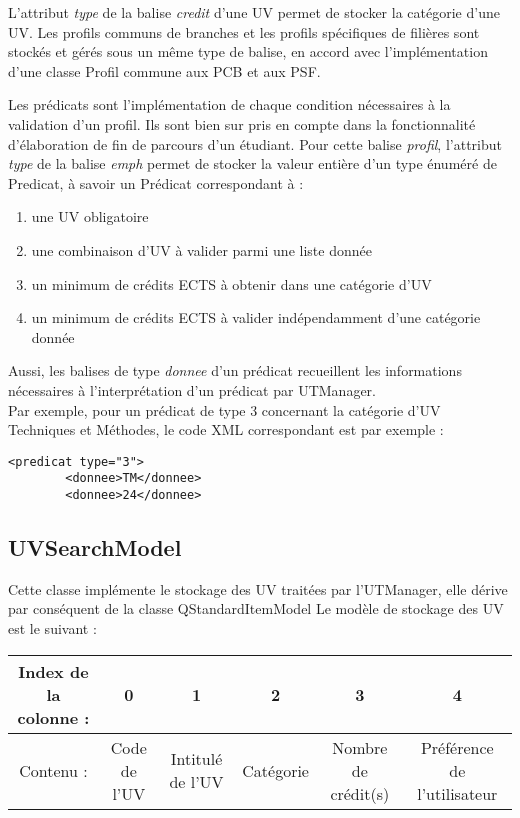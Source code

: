 \documentclass[a4paper,10pt,french]{report}
\begin{document}
	L'attribut \emph{type} de la balise \emph{credit} d'une UV permet de stocker la catégorie d'une UV.
	Les profils communs de branches et les profils spécifiques de filières sont stockés et gérés sous un même type de balise, en accord avec l'implémentation d'une classe Profil commune aux PCB et aux PSF.
	
	Les prédicats sont l'implémentation de chaque condition nécessaires à la validation d'un profil.
	Ils sont bien sur pris en compte dans la fonctionnalité d'élaboration de fin de parcours d'un étudiant.	
	Pour cette balise \emph{profil}, l'attribut \emph{type} de la balise \emph{emph} permet de stocker la valeur entière d'un type énuméré de Predicat, à savoir un Prédicat correspondant à :
	\begin{enumerate}
	\item une UV obligatoire
	\item une combinaison d'UV à valider parmi une liste donnée
	\item un minimum de crédits ECTS à obtenir dans une catégorie d'UV
	\item un minimum de crédits ECTS à valider indépendamment d'une catégorie donnée
	\end{enumerate}
	Aussi, les balises de type \emph{donnee} d'un prédicat recueillent les informations nécessaires à l'interprétation d'un prédicat par UTManager.\\
	Par exemple, pour un prédicat de type 3 concernant la catégorie d'UV Techniques et Méthodes, le code XML correspondant est par exemple :
	\begin{verbatim}
<predicat type="3">
		<donnee>TM</donnee>
		<donnee>24</donnee>
	\end{verbatim}
	
	
	\subsection{UVSearchModel}\label{subsec:UVSearchModel}
	
	Cette classe implémente le stockage des UV traitées par l'UTManager, elle dérive par conséquent de la classe QStandardItemModel
	Le modèle de stockage des UV est le suivant :
	
	\begin{tabular}{|c||c|c|c|c|c|}
	\hline
	Index de la colonne :  & 0 & 1 & 2 & 3 & 4 \\ \hline
	Contenu : & Code de l'UV & Intitulé de l'UV & Catégorie & Nombre de crédit(s) & Préférence de l'utilisateur \\
	\hline
	\end{tabular}
	
\end{document}
